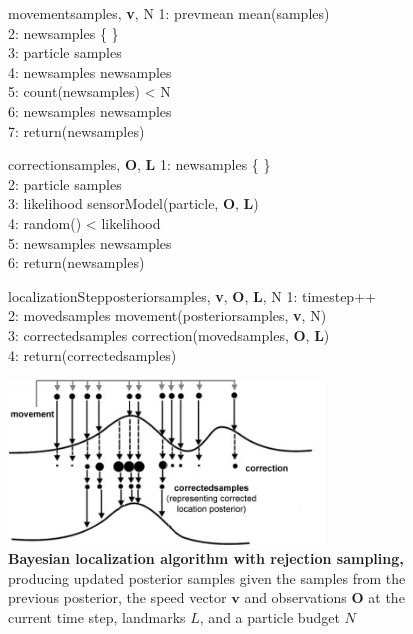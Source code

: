 \begin{figure}[h]
	\begin{pseudocode}{movement}{samples, \textbf{v}, N}
		1: prevmean \GETS mean(samples) \\
		2: newsamples \GETS \{ \} \\
		3: \FOREACH particle \in samples \\
		4: \quad newsamples \GETS newsamples  \\
		5: \WHILE count(newsamples) < N \\
		6: \quad newsamples \GETS newsamples  \\
		7: return(newsamples)
	\end{pseudocode}
	\begin{pseudocode}{correction}{samples, \textbf{O}, \textbf{L}}
		1: newsamples \GETS \{ \} \\
		2: \FOREACH particle \in samples \\
		3: \quad likelihood \GETS sensorModel(particle, \textbf{O}, \textbf{L}) \\
		4: \quad \IF random() < likelihood \\
		5: \quad \quad newsamples \GETS newsamples  \\
		6: return(newsamples)
	\end{pseudocode}
	\begin{pseudocode}{localizationStep}{posteriorsamples, \textbf{v}, \textbf{O}, \textbf{L}, N}
		1: timestep++ \\
		2: movedsamples \GETS movement(posteriorsamples, \textbf{v}, N) \\
		3: correctedsamples \GETS  correction(movedsamples, \textbf{O}, \textbf{L}) \\
		4: return(correctedsamples)
	\end{pseudocode}
	\centering
	\includegraphics[width=0.75\textwidth]{img/rejectionsampling}
	\caption[Bayesian localization algorithm with rejection sampling]{\textbf{Bayesian localization algorithm with rejection sampling,} producing updated posterior samples given the samples from the previous posterior, the speed vector $\bm v$ and observations $\bm O$ at the current time step, landmarks $L$, and a particle budget $N$}
	\label{fig:bayesloc}
\end{figure}

